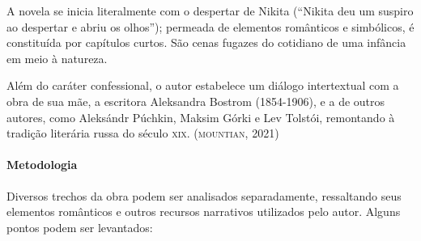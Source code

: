 \documentclass[11pt]{extarticle}
\begin{document}
A novela se inicia literalmente com o despertar de Nikita (``Nikita deu
um suspiro ao despertar e abriu os olhos''); permeada de elementos
românticos e simbólicos, é constituída por capítulos curtos. São cenas
fugazes do cotidiano de uma infância em meio à natureza.

Além do caráter confessional, o autor estabelece um diálogo intertextual
com a obra de sua mãe, a escritora Aleksandra Bostrom (1854-1906), e a
de outros autores, como Aleksándr Púchkin, Maksim Górki e Lev Tolstói,
remontando à tradição literária russa do século \textsc{xix}. (\textsc{mountian}, 2021)

\paragraph{Metodologia}
Diversos trechos da obra podem ser analisados separadamente, ressaltando
seus elementos românticos e outros recursos narrativos utilizados pelo
autor. Alguns pontos podem ser levantados:
\end{document}
